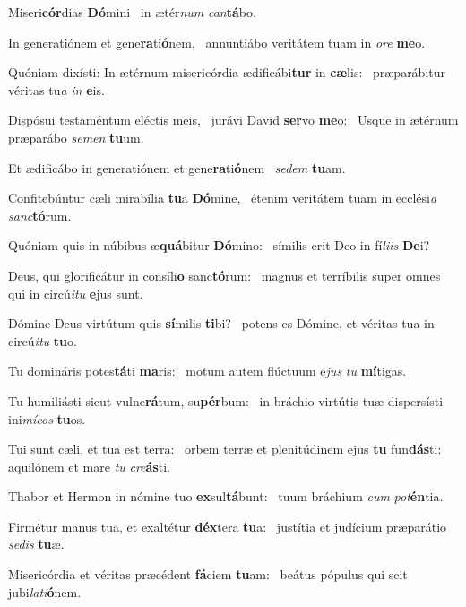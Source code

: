 \item Miseri\textbf{cór}dias \textbf{Dó}mini~\psstar{} in ætér\textit{num} \textit{can}\textbf{tá}bo.
\item In generatiónem et gene\textbf{ra}ti\textbf{ó}\-nem,~\psstar{} annuntiábo veritátem tuam in \textit{ore} \textbf{me}o.
\item Quóniam dixísti: In ætérnum misericórdia ædificábi\textbf{tur} in \textbf{cæ}lis:~\psstar{} præparábitur véritas tu\textit{a} \textit{in} \textbf{e}is.
\item Dispósui testaméntum eléctis meis,~\pscross{} jurávi David \textbf{ser}vo \textbf{me}o:~\psstar{} Usque in ætérnum præparábo \textit{semen} \textbf{tu}um.
\item Et ædificábo in generatiónem et gene\textbf{ra}ti\textbf{ó}nem~\psstar{} \textit{sedem} \textbf{tu}am.
\item Confitebúntur cæli mirabília \textbf{tu}a \textbf{Dó}mine,~\psstar{} étenim veritátem tuam in ecclési\textit{a} \textit{sanc}\textbf{tó}rum.
\item Quóniam quis in núbibus æ\textbf{quá}bitur \textbf{Dó}mino:~\psstar{} símilis erit Deo in fí\textit{liis} \textbf{De}i?
\item Deus, qui glorificátur in consíli\textbf{o} sanc\textbf{tó}rum:~\psstar{} magnus et terríbilis super omnes qui in circú\textit{itu} \textbf{e}jus sunt.
\item Dómine Deus virtútum quis \textbf{sí}milis \textbf{ti}bi?~\psstar{} potens es Dómine, et véritas tua in circú\textit{itu} \textbf{tu}o.
\item Tu domináris potes\textbf{tá}ti \textbf{ma}ris:~\psstar{} motum autem flúctuum e\textit{jus} \textit{tu} \textbf{mí}tigas.
\item Tu humiliásti sicut vulne\textbf{rá}\-tum, su\textbf{pér}bum:~\psstar{} in bráchio virtútis tuæ dispersísti ini\textit{mícos} \textbf{tu}os.
\item Tui sunt cæli, et tua est terra:~\pscross{} orbem terræ et plenitúdinem ejus \textbf{tu} fun\textbf{dás}ti:~\psstar{} aquilónem et mare \textit{tu} \textit{cre}\textbf{ás}ti.
\item Thabor et Hermon in nómine tuo \textbf{ex}sul\textbf{tá}bunt:~\psstar{} tuum bráchium \textit{cum} \textit{pot}\textbf{én}tia.
\item Firmétur manus tua, et exaltétur \textbf{déx}tera \textbf{tu}a:~\psstar{} justítia et judícium præparátio \textit{sedis} \textbf{tu}æ.
\item Misericórdia et véritas præcédent \textbf{fá}ciem \textbf{tu}am:~\psstar{} beátus pópulus qui scit jubi\textit{lati}\textbf{ó}nem.
